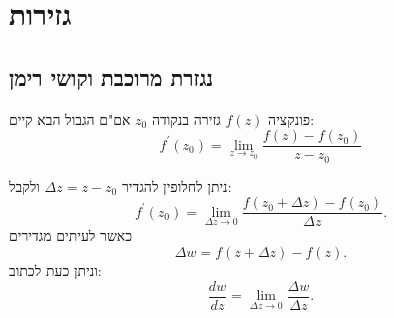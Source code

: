 \documentclass{tstextbook}
\begin{document}
\chapter{גזירות}

\section{נגזרת מרוכבת וקושי רימן}

\begin{definition}
פונקציה \(f(z)\) גזירה בנקודה \(z_{0}\) אם"ם הגבול הבא קיים:
$$f^{\prime}(z_{0})=\operatorname*{lim}_{z\to z_{0}}{\frac{f(z)-f(z_{0})}{z-z_{0}}}$$

\end{definition}
ניתן לחלופין להגדיר \(\Delta z=z-z_{0}\) ולקבל:
$$f^{\prime}(z_{0})=\operatorname*{lim}_{\Delta z\to0}{\frac{f(z_{0}+\Delta z)-f(z_{0})}{\Delta z}}.$$
כאשר לעיתים מגדירים
$$\Delta w=f(z+\Delta z)-f(z).$$
וניתן כעת לכתוב:
$$\frac{d w}{d z}=\operatorname*{lim}_{\Delta z\to0}\frac{\Delta w}{\Delta z}.$$
\end{document}
